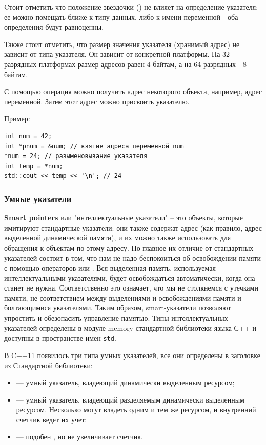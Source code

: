 Cтоит отметить что положение звездочки (\mverb{*}) не влияет на определение указателя: ее можно помещать ближе к типу данных, либо к имени переменной - оба определения будут равноценны.

Также стоит отметить, что размер значения указателя (хранимый адрес) не зависит от типа указателя. Он зависит от конкретной платформы. На 32-разрядных платформах размер адресов равен 4 байтам, а на 64-разрядных - 8 байтам.

С помощью операция \mverb{&} можно получить адрес некоторого объекта, например, адрес переменной. Затем этот адрес можно присвоить указателю.

\vspace{\baselineskip}

\noindent\underline{Пример}:
\begin{verbatim}
int num = 42;
int *pnum = &num; // взятие адреса переменной num
*num = 24; // разыменовывание указателя 
int temp = *num;
std::cout << temp << '\n'; // 24
\end{verbatim}

\subsubsection{Умные указатели}

\textbf{Smart pointers} или "интеллектуальные указатели" -- это объекты, которые имитируют стандартные указатели: они также содержат адрес (как правило, адрес выделенной динамической памяти), и их можно также использовать для обращения к объектам по этому адресу. Но главное их отличие от стандартных указателей состоит в том, что нам не надо беспокоиться об освобождении памяти с помощью операторов  или . Вся выделенная память, используемая интеллектуальными указателями, будет освобождаться автоматически, когда она станет не нужна. Соответственно это означает, что мы не столкнемся с утечками памяти, не соответствием между выделениями и освобождениями памяти и болтающимися указателями. Таким образом, smart-указатели позволяют упростить и обезопасить управление памятью. Типы интеллектуальных указателей определены в модуле memory стандартной библиотеки языка С++ и доступны в пространстве имен \texttt{std}.

В C++11 появилось три типа умных указателей, все они определены в заголовке из Стандартной библиотеки:
\begin{itemize}
    \item {} — умный указатель, владеющий динамически выделенным ресурсом;
    \item {} — умный указатель, владеющий разделяемым динамически выделенным ресурсом. Несколько  могут владеть одним и тем же ресурсом, и внутренний счетчик ведет их учет;
    \item {} — подобен , но не увеличивает счетчик.
\end{itemize}

